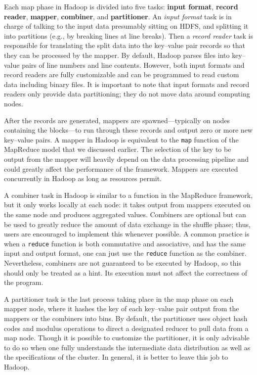 \documentclass[]{krantz}
\begin{document}
Each map phase in Hadoop is divided into five tasks: \textbf{input
format}, \textbf{record reader}, \textbf{mapper}, \textbf{combiner}, and
\textbf{partitioner}. An \emph{input format} task is in charge of
talking to the input data presumably sitting on HDFS, and splitting it
into partitions (e.g., by breaking lines at line breaks). Then a
\emph{record reader} task is responsible for translating the split data
into the key--value pair records so that they can be processed by the
mapper. By default, Hadoop parses files into key--value pairs of line
numbers and line contents. However, both input formats and record
readers are fully customizable and can be programmed to read custom data
including binary files. It is important to note that input formats and
record readers only provide data partitioning; they do not move data
around computing nodes.

After the records are generated, mappers are spawned---typically on
nodes containing the blocks---to run through these records and output
zero or more new key--value pairs. A mapper in Hadoop is equivalent to
the \texttt{map} function of the MapReduce model that we discussed
earlier. The selection of the key to be output from the mapper will
heavily depend on the data processing pipeline and could greatly affect
the performance of the framework. Mappers are executed concurrently in
Hadoop as long as resources permit.

A combiner task in Hadoop is similar to a function in the MapReduce
framework, but it only works locally at each node: it takes output from
mappers executed on the same node and produces aggregated values.
Combiners are optional but can be used to greatly reduce the amount of
data exchange in the shuffle phase; thus, users are encouraged to
implement this whenever possible. A common practice is when a
\texttt{reduce} function is both commutative and associative, and has
the same input and output format, one can just use the \texttt{reduce}
function as the combiner. Nevertheless, combiners are not guaranteed to
be executed by Hadoop, so this should only be treated as a hint. Its
execution must not affect the correctness of the program.

A partitioner task is the last process taking place in the map phase on
each mapper node, where it hashes the key of each key--value pair output
from the mappers or the combiners into bins. By default, the partitioner
uses object hash codes and modulus operations to direct a designated
reducer to pull data from a map node. Though it is possible to customize
the partitioner, it is only advisable to do so when one fully
understands the intermediate data distribution as well as the
specifications of the cluster. In general, it is better to leave this
job to Hadoop.
\end{document}
